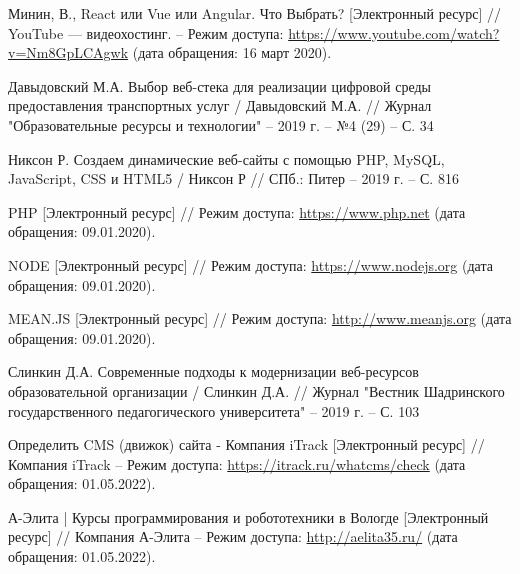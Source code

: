 \begin{thebibliography}{00}
        Минин, В., React или Vue или Angular. Что Выбрать?
        [Электронный ресурс]
        //
        YouTube — видеохостинг.
        --
        Режим доступа:
        \href{https://www.youtube.com/watch?v=Nm8GpLCAgwk}{https://www.youtube.com/watch?v=Nm8GpLCAgwk}
        (дата обращения: 16 март 2020).

        Давыдовский М.А. Выбор веб-стека для реализации цифровой среды предоставления транспортных услуг
        /
        Давыдовский М.А.
        //
        Журнал "Образовательные ресурсы и технологии"
        --
        2019 г.
        --
        №4 (29)
        --
        С. 34

        Никсон Р. Создаем динамические веб-сайты с помощью PHP, MySQL, JavaScript, CSS и HTML5
        /
        Никсон Р
        //
        СПб.: Питер
        --
        2019 г.
        --
        С. 816

        PHP
        [Электронный ресурс]
        //
        Режим доступа:
        \href{https://www.php.net}{https://www.php.net}
        (дата обращения: 09.01.2020).

        NODE
        [Электронный ресурс]
        //
        Режим доступа:
        \href{https://www.nodejs.org}{https://www.nodejs.org}
        (дата обращения: 09.01.2020).


        MEAN.JS
        [Электронный ресурс]
        //
        Режим доступа:
        \href{http://www.meanjs.org}{http://www.meanjs.org}
        (дата обращения: 09.01.2020).

        Слинкин Д.А. Современные подходы к модернизации веб-ресурсов образовательной организации
        /
        Слинкин Д.А.
        //
        Журнал "Вестник Шадринского государственного педагогического университета"
        --
        2019 г.
        --
        С. 103

        Определить CMS (движок) сайта - Компания iTrack
        [Электронный ресурс]
        //
        Компания iTrack
        --
        Режим доступа:
        \href{https://itrack.ru/whatcms/check}{https://itrack.ru/whatcms/check}
        (дата обращения: 01.05.2022).

        А-Элита | Курсы программирования и робототехники в Вологде
        [Электронный ресурс]
        //
        Компания А-Элита
        --
        Режим доступа:
        \href{http://aelita35.ru/}{http://aelita35.ru/}
        (дата обращения: 01.05.2022).


\end{thebibliography}
